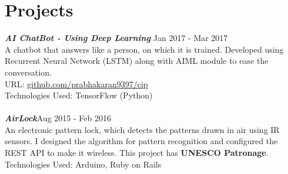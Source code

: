 \documentclass[10pt,a4paper,sans	]{moderncv}        %
\begin{document}
\section{\LARGE{Projects}}
{\textit{\textbf{AI ChatBot - Using Deep Learning}}} \hfill Jan 2017 - Mar 2017 \\
A chatbot that answers like a person, on which it is trained. Developed using Recurrent Neural Network (LSTM) along with AIML module to ease the conversation.\\
URL: \href{https://github.com/prabhakaran9397/cip}{github.com/prabhakaran9397/cip} \\
Technologies Used: TensorFlow (Python) \\
\\
{\textit{\textbf{AirLock}}}\hfill Aug 2015 - Feb 2016 \\
An electronic pattern lock, which detects the patterns drawn in air using IR sensors. I designed the algorithm for pattern recognition and configured the REST API to make it wireless. This project has \textbf{UNESCO Patronage}.\\
Technologies Used:  Arduino, Ruby on Rails\\
\\
\end{document}

